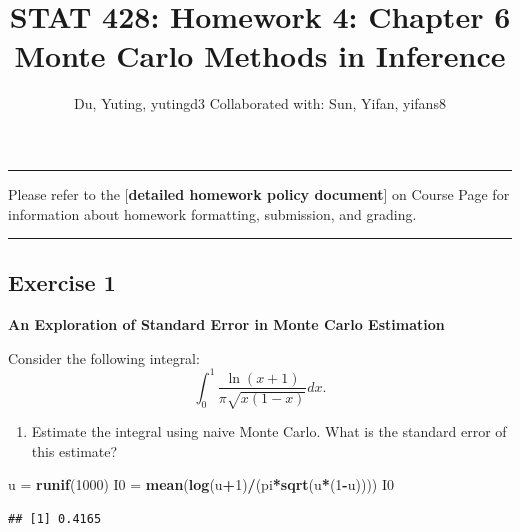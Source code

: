 \documentclass[
]{article}
\title{STAT 428: Homework 4: Chapter 6 Monte Carlo Methods in Inference}
\author{Du, Yuting, yutingd3 Collaborated with: Sun, Yifan, yifans8}
\date{}
\newenvironment{Shaded}{\begin{snugshade}}{\end{snugshade}}
\newcommand{\DecValTok}[1]{\textcolor[rgb]{0.00,0.00,0.81}{#1}}
\newcommand{\KeywordTok}[1]{\textcolor[rgb]{0.13,0.29,0.53}{\textbf{#1}}}
\newcommand{\NormalTok}[1]{#1}
\newcommand{\OperatorTok}[1]{\textcolor[rgb]{0.81,0.36,0.00}{\textbf{#1}}}
\newcommand{\StringTok}[1]{\textcolor[rgb]{0.31,0.60,0.02}{#1}}
\providecommand{\tightlist}{%
  \setlength{\itemsep}{0pt}\setlength{\parskip}{0pt}}
\begin{document}
\maketitle

{
\setcounter{tocdepth}{2}
\tableofcontents
}
\begin{center}\rule{0.5\linewidth}{\linethickness}\end{center}

Please refer to the {[}\textbf{detailed homework policy document}{]} on
Course Page for information about homework formatting, submission, and
grading.

\begin{center}\rule{0.5\linewidth}{\linethickness}\end{center}

\hypertarget{exercise-1}{%
\subsection{Exercise 1}\label{exercise-1}}

\textbf{An Exploration of Standard Error in Monte Carlo Estimation}

Consider the following integral:\\
\[
   \int_0^{1}{\frac{\ln{(x+1)}}{\pi\sqrt{x(1-x)}}}dx.
   \]

\begin{enumerate}
\def\labelenumi{\alph{enumi}.}
\tightlist
\item
  Estimate the integral using naive Monte Carlo. What is the standard
  error of this estimate?
\end{enumerate}

\begin{Shaded}
\begin{Highlighting}[]
\NormalTok{u =}\StringTok{ }\KeywordTok{runif}\NormalTok{(}\DecValTok{1000}\NormalTok{)}
\NormalTok{I0 =}\StringTok{ }\KeywordTok{mean}\NormalTok{(}\KeywordTok{log}\NormalTok{(u}\OperatorTok{+}\DecValTok{1}\NormalTok{)}\OperatorTok{/}\NormalTok{(pi}\OperatorTok{*}\KeywordTok{sqrt}\NormalTok{(u}\OperatorTok{*}\NormalTok{(}\DecValTok{1}\OperatorTok{-}\NormalTok{u))))}
\NormalTok{I0}
\end{Highlighting}
\end{Shaded}

\begin{verbatim}
## [1] 0.4165
\end{verbatim}
\end{document}
